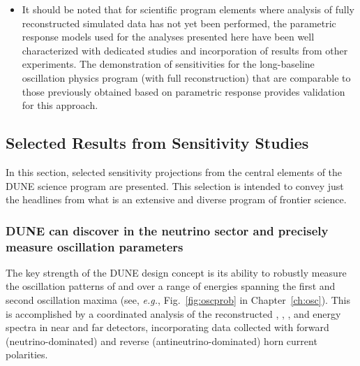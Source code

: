 \begin{itemize}

\item It should be noted that for scientific program elements where
      analysis of fully reconstructed simulated data has 
      not yet been performed, the parametric response models used for the analyses presented here have
      been well characterized with dedicated studies
      and incorporation of results from other experiments.
      The demonstration of sensitivities for the long-baseline
      oscillation physics program (with full reconstruction) 
      that are comparable to those
      previously obtained based on parametric response
      provides validation for this approach.
\end{itemize}


\subsection{Selected Results from Sensitivity Studies}
\label{sec:exec-sensitiv-results}

In this section, selected sensitivity projections from the 
central elements of the DUNE science program are presented.  
This selection is intended to convey just the headlines from 
what is an extensive and diverse program of frontier science.

\subsubsection{DUNE can discover  in the neutrino 
sector and precisely measure oscillation parameters}

The key strength of the DUNE design concept is its ability to 
robustly measure the oscillation patterns of \numu and \anumu 
over a range of energies spanning the first and second 
oscillation maxima (see, {\sl e.g.},  Fig.~\ref{fig:oscprob} 
in Chapter~\ref{ch:osc}). 
This is accomplished by a coordinated analysis of the 
reconstructed \numu, \anumu, \nue, and \anue energy spectra 
in near and far detectors, 
incorporating data collected with forward (neutrino-dominated) 
and reverse (antineutrino-dominated) horn current polarities.  

